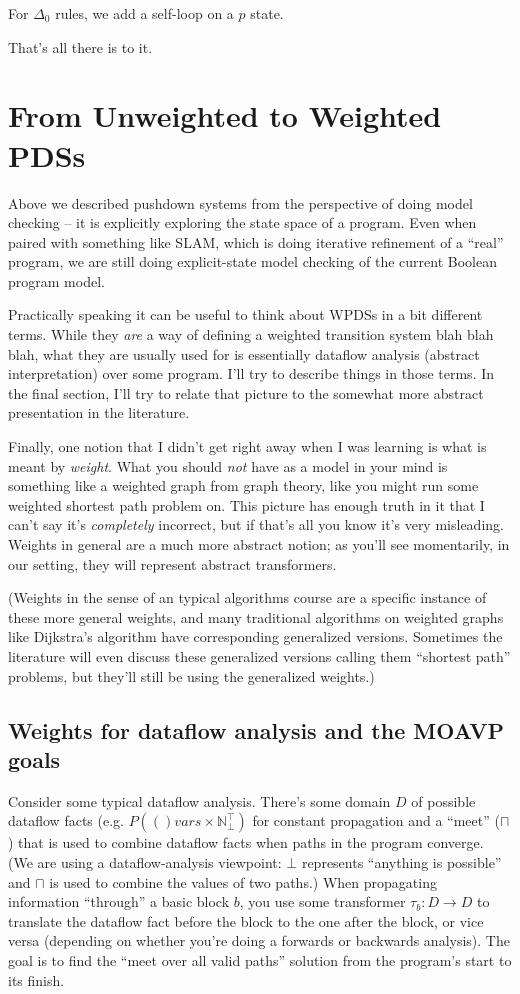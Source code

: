 \documentclass{article}
\newcommand{\powerset}[1]{P(#1)}
\newcommand{\bbN}{\mathbb{N}}
\newcommand{\meet}{\sqcap}
\begin{document}
For $\Delta_0$ rules, we add a self-loop on a $p$ state.

That's all there is to it.


\section{From Unweighted to Weighted PDSs}

Above we described pushdown systems from the perspective of doing
model checking -- it is explicitly exploring the state space of a
program. Even when paired with something like SLAM, which is doing
iterative refinement of a ``real'' program, we are still doing
explicit-state model checking of the current Boolean program model.

Practically speaking it can be useful to think about WPDSs in a bit
different terms. While they \emph{are} a way of defining a weighted
transition system blah blah blah, what they are usually used for is
essentially dataflow analysis (abstract interpretation) over some
program. I'll try to describe things in those terms. In the final
section, I'll try to relate that picture to the somewhat more abstract
presentation in the literature.

Finally, one notion that I didn't get right away when I was learning
is what is meant by \emph{weight}. What you should \emph{not} have as
a model in your mind is something like a weighted graph from graph
theory, like you might run some weighted shortest path problem
on. This picture has enough truth in it that I can't say it's
\emph{completely} incorrect, but if that's all you know it's very
misleading. Weights in general are a much more abstract notion; as
you'll see momentarily, in our setting, they will represent abstract
transformers.

(Weights in the sense of an typical algorithms course are a specific
instance of these more general weights, and many traditional
algorithms on weighted graphs like Dijkstra's algorithm have
corresponding generalized versions. Sometimes the literature will even
discuss these generalized versions calling them ``shortest path''
problems, but they'll still be using the generalized weights.)

\subsection{Weights for dataflow analysis and the MOAVP goals}

Consider some typical dataflow analysis. There's some domain $D$ of
possible dataflow facts (e.g. $\powerset(vars \times \bbN_\bot^\top)$
for constant propagation and a ``meet'' ($\meet$) that is used to
combine dataflow facts when paths in the program converge. (We are
using a dataflow-analysis viewpoint: $\bot$ represents ``anything is
possible'' and $\meet$ is used to combine the values of two paths.)
When propagating information ``through'' a basic block $b$, you use
some transformer $\tau_b: D \rightarrow D$ to translate the dataflow
fact before the block to the one after the block, or vice versa
(depending on whether you're doing a forwards or backwards
analysis). The goal is to find the ``meet over all valid paths''
solution from the program's start to its finish\footnotemark.
\end{document}
